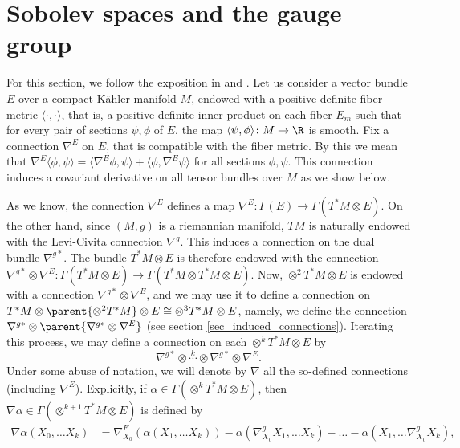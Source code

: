 \section{Sobolev spaces and the gauge group} \label{section_Sobolev_spaces} 
For this section, we follow the exposition in \parencite{wehrheim2004uhlenbeck} and \parencite{Rudolph_2017pug}. Let us consider a vector bundle \(E\) over a compact Kähler manifold \(M\), endowed with a positive-definite fiber metric \(\langle \cdot, \cdot \rangle\), that is, a positive-definite inner product on each fiber \(E_m\) such that for every pair of sections \(\psi, \phi\) of \(E\), the map \(\langle \psi, \phi \rangle \colon M \to \R\) is smooth. Fix a connection \(\nabla^E\) on \(E\), that is compatible with the fiber metric. By this we mean that \(\nabla^E \langle \phi, \psi \rangle = \langle \nabla^E \phi, \psi \rangle + \langle \phi, \nabla^E \psi \rangle\) for all sections \(\phi, \psi\). This connection induces a covariant derivative on all tensor bundles over \(M\) as we show below. 

As we know, the connection \(\nabla^E\) defines a map \(\nabla^E\colon \Gamma(E) \to \Gamma(T^*M \otimes E)\). On the other hand, since \((M,g)\) is a riemannian manifold, \(TM\) is naturally endowed with the Levi-Civita connection \(\nabla^g\). This induces a connection on the dual bundle \(\nabla^{g*}\). The bundle \(T^*M \otimes E\) is therefore endowed with the connection \(\nabla^{g*} \otimes \nabla^E \colon \Gamma(T^*M \otimes E) \to \Gamma(T^*M \otimes T^*M \otimes E)\). Now, \(\otimes^2 T^*M \otimes E\) is endowed with a connection \(\nabla^{g*} \otimes \nabla^E\), and we may use it to define a connection on \(T^*M \otimes \parent{\otimes^2 T^*M} \otimes E \cong\otimes^3 T^*M \otimes E\), namely, we define the connection \(\nabla^{g*} \otimes \parent{\nabla^{g*} \otimes \nabla^E}\) (see section \ref{sec_induced_connections}). Iterating this process, we may define a connection on each \(\otimes^k T^*M\otimes E\) by 
\[
\nabla^{g*} \otimes \overset{k}{\cdots} \otimes \nabla^{g*} \otimes \nabla^E.
\]
Under some abuse of notation, we will denote by \(\nabla\) all the so-defined connections (including \(\nabla^E\)). Explicitly, if \(\alpha \in \Gamma(\otimes^k T^*M \otimes E)\), then \(\nabla \alpha \in \Gamma(\otimes^{k+1}T^*M \otimes E)\) is defined by \parencite[Eq. B2]{wehrheim2004uhlenbeck}
\begin{align*}
    \nabla \alpha(X_0, \ldots X_k)& =  \nabla^E_{X_0}(\alpha(X_1, \ldots X_k)) - \alpha(\nabla_{X_0}^g X_1, \ldots X_k) - \ldots - \alpha(X_1, \ldots \nabla_{X_0}^g X_k), 
\end{align*}

